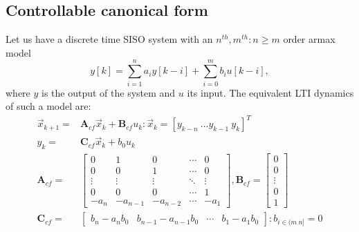 \documentclass[runningheads,a4paper]{llncs}
\newcommand{\mat}[1]{\boldsymbol{#1}}
\begin{document}
\subsection{Controllable canonical form} \label{sec:reachable}

Let us have a discrete time SISO system with an $n^{th},m^{th} : n\geq m$ order armax model
$$y[k]=\sum_{i=1}^n a_iy[k-i]+\sum_{i=0}^m b_iu[k-i],$$
where $y$ is the output of the system and $u$ its input.
The equivalent LTI dynamics of such a model are:
\begin{align}
\label{eq:cf_SISO}
\vec{x}_{k+1}=&\mat{A}_{cf}\vec{x}_k+\mat{B}_{cf}u_k : \vec{x}_k=[y_{k-n}\ \hdots y_{k-1}\ y_{k}]^T\\
y_k=&\mat{C}_{cf}\vec{x}_k + b_0u_k\nonumber\\
\mat{A}_{cf}=&\left[
\begin{array}{ccccc}
0&1&0&\cdots&0\\
0&0&1&\cdots&0\\
\vdots&\vdots&\vdots&\ddots&\vdots\\
0&0&0&\cdots&1\\
-a_n&-a_{n-1}&-a_{n-2}&\cdots&-a_1
\end{array}\right],
\mat{B}_{cf}=\left[
\begin{array}{c}
0\\0\\ \vdots\\ 0\\ 1
\end{array}\right]\nonumber\\
\mat{C}_{cf}=&[\begin{array}{ccccc}b_n-a_nb_0&b_{n-1}-a_{n-1}b_0&\cdots&b_1-a_1b_0\end{array}] : b_{i \in (m\ n]}=0\nonumber
\end{align}
\end{document}
